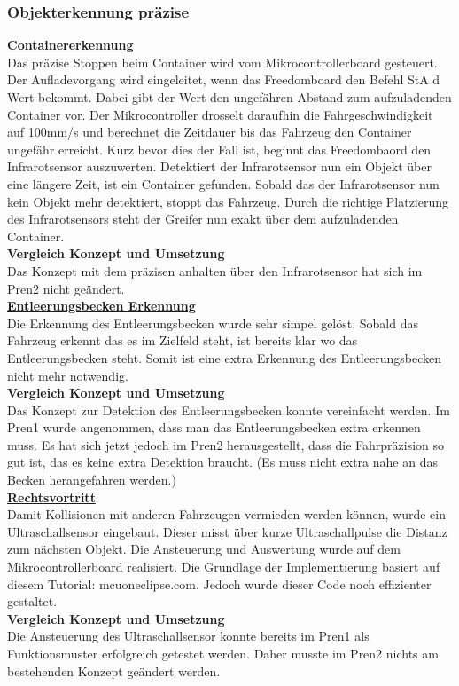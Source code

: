 \subsubsection{Objekterkennung präzise}
\underline{\textbf{Containererkennung}}\\[0.2cm]
Das präzise Stoppen beim Container wird vom Mikrocontrollerboard gesteuert. Der Aufladevorgang wird eingeleitet, wenn das Freedomboard den Befehl StA d Wert bekommt. Dabei gibt der Wert den ungefähren Abstand zum aufzuladenden Container vor. Der Mikrocontroller drosselt daraufhin die Fahrgeschwindigkeit auf 100mm/s und berechnet die Zeitdauer bis das Fahrzeug den Container ungefähr erreicht. Kurz bevor dies der Fall ist, beginnt das Freedombaord den Infrarotsensor auszuwerten. Detektiert der Infrarotsensor nun ein Objekt über eine längere Zeit, ist ein Container gefunden. Sobald das der Infrarotsensor nun kein Objekt mehr detektiert, stoppt das Fahrzeug. Durch die richtige Platzierung des Infrarotsensors steht der Greifer nun exakt über dem aufzuladenden Container.\\[0.2cm]
\textbf{Vergleich Konzept und Umsetzung}\\[0.2cm]
Das Konzept mit dem präzisen anhalten über den Infrarotsensor hat sich im Pren2 nicht geändert.
\\[0.2cm]
\underline{\textbf{Entleerungsbecken Erkennung}} \\[0.2cm]
Die Erkennung des Entleerungsbecken wurde sehr simpel gelöst. Sobald das Fahrzeug erkennt das es im Zielfeld steht, ist bereits klar wo das Entleerungsbecken steht. Somit ist eine extra Erkennung des Entleerungsbecken nicht mehr notwendig.\\[0.2cm]
\textbf{Vergleich Konzept und Umsetzung}\\[0.2cm]
Das Konzept zur Detektion des Entleerungsbecken konnte vereinfacht werden. Im Pren1 wurde angenommen, dass man das Entleerungsbecken extra erkennen muss. Es hat sich jetzt jedoch im Pren2 herausgestellt, dass die Fahrpräzision so gut ist, das es keine extra Detektion braucht. (Es muss nicht extra nahe an das Becken herangefahren werden.)
\\[0.2cm]
\underline{\textbf{Rechtsvortritt}}\\[0.2cm]
Damit Kollisionen mit anderen Fahrzeugen vermieden werden können, wurde ein Ultraschallsensor eingebaut. Dieser misst über kurze Ultraschallpulse die Distanz zum nächsten Objekt. Die Ansteuerung und Auswertung wurde auf dem Mikrocontrollerboard realisiert. Die Grundlage der Implementierung basiert auf diesem Tutorial: mcuoneclipse.com. Jedoch wurde dieser Code noch effizienter gestaltet.\\[0.2cm]
\textbf{Vergleich Konzept und Umsetzung}\\[0.2cm]
Die Ansteuerung des Ultraschallsensor konnte bereits im Pren1 als Funktionsmuster erfolgreich getestet werden. Daher musste im Pren2 nichts am bestehenden Konzept geändert werden.